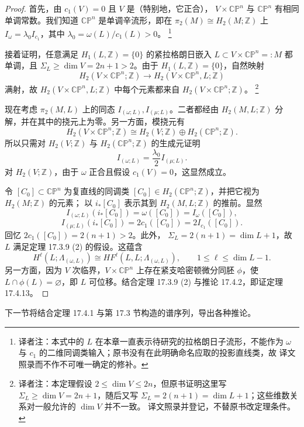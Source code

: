 \begin{proof}
首先，由 $c_1(V)=0$ 且 $V$ 是\personWeinstein{}（特别地，它正合），
$V\times\mathbb{CP}^n$ 与 $\mathbb{CP}^n$ 有相同单调常数。我们知道
$\mathbb{CP}^n$ 是单调辛流形，即在
$\pi_2(M)\cong H_2(M;\mathbb Z)$ 上
$I_\omega=\lambda_0I_{c_1}$，其中
$\lambda_0=\omega(L)/c_1(L)>0$。
\footnote{译者注：本式中的 $L$ 在本章一直表示待研究的拉格朗日子流形，不能作为
$\omega$ 与 $c_1$ 的二维同调类输入；原书没有在此明确命名应取的投影直线类，故
译文照录而不作不可唯一确定的修补。}

接着证明，任意满足 $H_1(L,\mathbb Z)=\{0\}$ 的紧拉格朗日嵌入
$L\subset V\times\mathbb{CP}^n=:M$ 都单调，且
$\Sigma_L\geq\dim V=2n+1>2$。由于 $H_1(L,\mathbb Z)=\{0\}$，自然映射
\[
 H_2(V\times\mathbb{CP}^n;\mathbb Z)
 \longrightarrow H_2(V\times\mathbb{CP}^n,L;\mathbb Z)
\]
满射，故 $H_2(V\times\mathbb{CP}^n,L;\mathbb Z)$ 中每个元素都来自
$H_2(V\times\mathbb{CP}^n;\mathbb Z)$。
\footnote{译者注：本定理假设 $2\leq\dim V\leq2n$，但原书证明这里写
$\Sigma_L\geq\dim V=2n+1$，随后又写
$\Sigma_L=2(n+1)=\dim L+1$；这些维数关系对一般允许的 $\dim V$ 并不一致。
译文照录并登记，不替原书改定理条件。}

现在考虑 $\pi_2(M,L)$ 上的同态 $I_{(\omega;L)},I_{(\mu;L)}$。二者都经由
$H_2(M,L;\mathbb Z)$ 分解，并在其中的挠元上为零。另一方面，模挠元有
\[
 H_2(V\times\mathbb{CP}^n;\mathbb Z)
 \cong H_2(V;\mathbb Z)\oplus H_2(\mathbb{CP}^n;\mathbb Z).
\]
所以只需对 $H_2(V;\mathbb Z)$ 与 $H_2(\mathbb{CP}^n;\mathbb Z)$ 的生成元证明
\begin{equation}
 I_{(\omega;L)}=\frac{\lambda_0}{2}I_{(\mu;L)}.
\label{eq:17-relative-monotonicity}
\end{equation}
对 $H_2(V;\mathbb Z)$，由于 $\omega$ 正合且假设 $c_1(V)=0$，这显然成立。

令 $[C_0]\subset\mathbb{CP}^n$ 为复直线的同调类
$[C_0]\in H_2(\mathbb{CP}^n;\mathbb Z)$，并把它视为 $H_2(M;\mathbb Z)$ 的元素；
以 $i_*[C_0]$ 表示其到 $H_2(M,L;\mathbb Z)$ 的推前。显然
\[
 I_{(\omega;L)}(i_*[C_0])=\omega([C_0])=I_\omega([C_0]),
\]
\[
 I_{(\mu;L)}(i_*[C_0])=2c_1([C_0])=2I_{c_1}([C_0]).
\]
回忆 $2c_1([C_0])=2(n+1)>2$。此外，
$\Sigma_L=2(n+1)=\dim L+1$，故 $L$ 满足定理 17.3.9 (2) 的假设。这蕴含
\[
 H^\ell(L;\Lambda_{(\omega,L)})
 \cong HF^\ell(L,L;\Lambda_{(\omega,L)}),
 \qquad1\leq\ell\leq\dim L-1.
\]
另一方面，因为 $V$ 次临界，$V\times\mathbb{CP}^n$ 上存在紧支哈密顿微分同胚
$\phi$，使 $L\cap\phi(L)=\varnothing$，即 $L$ 可位移。结合定理 17.3.9 (2)
与推论 17.4.2，即证定理 17.4.13。
\end{proof}

下一节将结合定理 17.4.1 与第 17.3 节构造的谱序列，导出各种推论。

